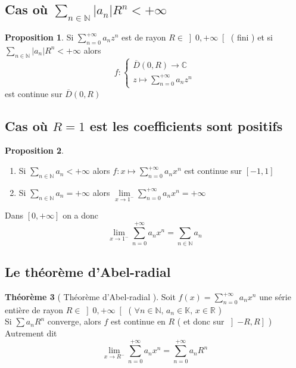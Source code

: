 \documentclass[10pt,a4paper]{article}
\theoremstyle{definition}
\newtheorem{proposition}{Proposition}[section]
\newtheorem{theorem}[proposition]{Théorème}
\begin{document}
\subsection{Cas où \(\sum\limits_{n \in \mathbb{N}} |a_n| R^n < +\infty\)}
\begin{proposition}
    Si \(\sum\limits_{n = 0}^{+\infty} a_n z^n\) est de rayon \(R \in \left] 0, +\infty \right[\) ( fini ) et si \(\sum\limits_{n \in \mathbb{N}} |a_n| R^n < +\infty\) alors
    \[f: \begin{cases} \overline{D}(0, R) \to \mathbb{C} \\
    z \mapsto \sum\limits_{n = 0}^{+\infty} a_n z^n \end{cases}\]
    est continue sur \(\overline{D}(0, R)\)
\end{proposition}

\subsection{Cas où \(R = 1\) est les coefficients sont positifs}
\begin{proposition} \hfill
    \begin{enumerate}
        \item Si \(\sum\limits_{n \in \mathbb{N}} a_n < +\infty\) alors \(f: x \mapsto \sum\limits_{n = 0}^{+\infty} a_n x^n\) est continue sur \([-1, 1]\)
        \item Si \(\sum\limits_{n \in \mathbb{N}} a_n = +\infty\) alors \(\lim\limits_{x \to 1^{-}} \sum\limits_{n = 0}^{+\infty} a_n x^n = +\infty\)
    \end{enumerate}
    Dans \([0, +\infty]\) on a donc
    \[\lim_{x \to 1^{-}} \sum_{n = 0}^{+\infty} a_n x^n = \sum_{n \in \mathbb{N}} a_n\]
\end{proposition}

\subsection{Le théorème d'Abel-radial}
\begin{theorem}[ Théorème d'Abel-radial ]
    Soit \(f(x) = \sum\limits_{n = 0}^{+\infty} a_n x^n\) une série entière de rayon \(R \in \left] 0, +\infty \right[\) ( \(\forall n \in \mathbb{N},\, a_n \in \mathbb{K},\, x \in \mathbb{R}\) ) \\
    Si \(\sum a_n R^n\) converge, alors \(f\) est continue en \(R\) ( et donc sur \(\left] -R, R \right]\) ) \\
    Autrement dit
    \[\lim_{x \to R^{-}} \sum_{n = 0}^{+\infty} a_n x^n = \sum_{n = 0}^{+\infty} a_n R^n\]
\end{theorem}
\end{document}
